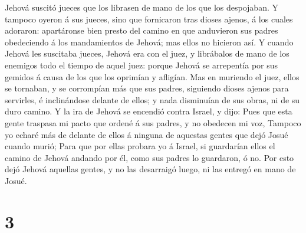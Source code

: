 Jehová suscitó jueces que los librasen de mano de los que los
despojaban.  Y tampoco oyeron á sus jueces, sino que
fornicaron tras dioses ajenos, á los cuales adoraron: apartáronse bien
presto del camino en que anduvieron sus padres obedeciendo á los
mandamientos de Jehová; mas ellos no hicieron así.  Y
cuando Jehová les suscitaba jueces, Jehová era con el juez, y librábalos
de mano de los enemigos todo el tiempo de aquel juez: porque Jehová se
arrepentía por sus gemidos á causa de los que los oprimían y afligían.
 Mas en muriendo el juez, ellos se tornaban, y se
corrompían más que sus padres, siguiendo dioses ajenos para servirles, é
inclinándose delante de ellos; y nada disminuían de sus obras, ni de su
duro camino.  Y la ira de Jehová se encendió contra
Israel, y dijo: Pues que esta gente traspasa mi pacto que ordené á sus
padres, y no obedecen mi voz,  Tampoco yo echaré más de
delante de ellos á ninguna de aquestas gentes que dejó Josué cuando
murió;  Para que por ellas probara yo á Israel, si
guardarían ellos el camino de Jehová andando por él, como sus padres lo
guardaron, ó no.  Por esto dejó Jehová aquellas gentes, y
no las desarraigó luego, ni las entregó en mano de Josué.

\hypertarget{section-2}{%
\section{3}\label{section-2}}

